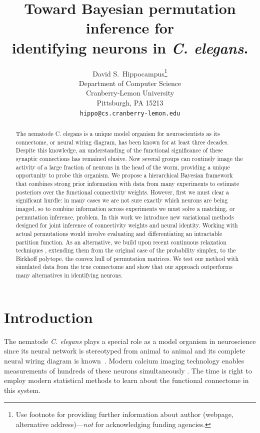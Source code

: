 \documentclass{article}
\title{Toward Bayesian permutation inference for \\identifying neurons in \textit{C. elegans}.}
\author{
  David S.~Hippocampus\thanks{Use footnote for providing further
    information about author (webpage, alternative
    address)---\emph{not} for acknowledging funding agencies.} \\
  Department of Computer Science\\
  Cranberry-Lemon University\\
  Pittsburgh, PA 15213 \\
  \texttt{hippo@cs.cranberry-lemon.edu} \\
}
\begin{document}

\maketitle

\begin{abstract}
  The nematode C. elegans is a unique model organism for
  neuroscientists as its connectome, or neural wiring diagram, has
  been known for at least three decades. Despite this knowledge, an
  understanding of the functional significance of these synaptic
  connections has remained elusive. Now several groups can routinely
  image the activity of a large fraction of neurons in the head of the
  worm, providing a unique opportunity to probe this organism. We
  propose a hierarchical Bayesian framework that combines strong prior
  information with data from many experiments to estimate posteriors
  over the functional connectivity weights. However, first we must
  clear a significant hurdle: in many cases we are not sure
  exactly which neurons are being imaged, so to combine information
  across experiments we must solve a matching, or permutation
  inference, problem. In this work we introduce new variational
  methods designed for joint inference of connectivity weights and
  neural identity. Working with actual permutations would involve
  evaluating and differentiating an intractable partition function. As
  an alternative, we build upon recent continuous relaxation
  techniques \citep{Jang2016, Maddison2016}, extending them from the
  original case of the probability simplex, to the Birkhoff polytope,
  the convex hull of permutation matrices. We test our method with
  simulated data from the true connectome and show that our approach
  outperforms many alternatives in identifying neurons.
\end{abstract}



\section{Introduction}
The nematode \textit{C. elegans} plays a special role as a model
organism in neuroscience since its neural network is stereotyped from
animal to animal and its complete neural wiring diagram is
known~\citep{varshney2011structural}.  Modern calcium imaging
technology enables measurements of hundreds of these neurons
simultaneously \citep{Kato2015, nguyen2016whole}. The time is
right to employ modern statistical methods to learn about the
functional connectome in this system.
\end{document}
